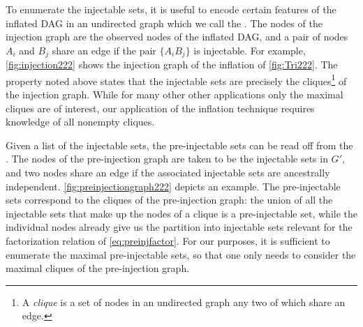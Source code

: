 {To enumerate the injectable sets, it is useful to encode certain features of the inflated DAG in an undirected graph which we call the . The nodes of the injection graph are the observed nodes of the inflated DAG, and a pair of nodes $A_i$ and $B_j$ share an edge if the pair $\{ A_i B_j\}$ is injectable. For example, \cref{fig:injection222} shows the injection graph of the inflation of \cref{fig:Tri222}.
The property noted above states that the injectable sets are precisely the cliques\footnote{A \emph{clique} is a set of nodes in an undirected graph any two of which share an edge.} of the injection graph.
While for many other other applications only the maximal cliques are of interest, our application of the inflation technique requires knowledge of all nonempty cliques. 

Given a list of the injectable sets, the pre-injectable sets can be read off from the .
The nodes of the pre-injection graph are taken to be the injectable sets in $G'$, and two nodes share an edge if the associated injectable sets are ancestrally independent. %
\cref{fig:preinjectiongraph222} depicts an example. 
The pre-injectable sets correspond to the cliques of the pre-injection graph: the union of all the injectable sets that make up the nodes of a clique is a pre-injectable set, while the individual nodes already give us the partition into injectable sets relevant for the factorization relation of \cref{eq:preinjfactor}. 
For our purposes, it is sufficient to enumerate the maximal pre-injectable sets, so that one only needs to consider the maximal cliques of the pre-injection graph.


}

